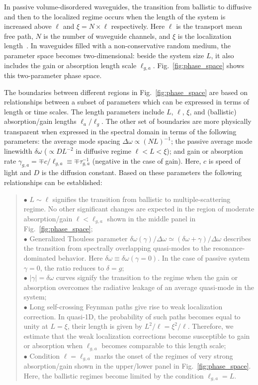 In passive volume-disordered waveguides, the transition from ballistic to diffusive and then to the localized regime occurs when the length of the system is increased above $\ell$ and $\xi=N\times\ell$ respectively. Here $\ell$ is the transport mean free path, $N$ is the number of waveguide channels, and $\xi$ is the localization length~\cite{1997_Beenakker}. In waveguides filled with a non-conservative random medium, the parameter space becomes two-dimensional: beside the system size $L$, it also includes the gain or absorption length scale $\ell_{g,a}$. Fig.~\ref{fig:phase_space} shows this two-parameter phase space.

The boundaries between different regions in Fig.~\ref{fig:phase_space} are based on relationships between a subset of parameters which can be expressed in terms of length or time scales. The length parameters include $L$, $\ell$, $\xi$, and (ballistic) absorption/gain lengths $\ell_a/\ell_g$. The other set of boundaries are more physically transparent when expressed in the spectral domain in terms of the following parameters: the average mode spacing $\Delta\omega\propto (NL)^{-1}$; the passive average mode linewidth $\delta\omega$ ($\propto DL^{-2}$ in diffusive regime $\ell<L<\xi$); and gain or absorption rate $\gamma_{g,a}=\mp c/\ell_{g,a}\equiv\mp\tau_{g,a}^{-1}$ (negative in the case of gain). Here, $c$ is speed of light and $D$ is the diffusion constant. Based on these parameters the following relationships can be established:
\begin{quote}
$\bullet$ $L\sim\ell$ signifies the transition from ballistic to multiple-scattering regime. No other significant changes are expected in the region of moderate absorption/gain $\ell<\ell_{g,a}$ shown in the middle panel in Fig.~\ref{fig:phase_space};\\
$\bullet$ Generalized Thouless parameter $\delta\omega(\gamma)/\Delta\omega\simeq(\delta\omega+\gamma)/\Delta\omega$ describes~\cite{2005_Yamilov_correlations} the transition from spectrally overlapping quasi-modes to the resonance-dominated behavior. Here $\delta\omega\equiv\delta\omega(\gamma=0)$. In the case of passive system $\gamma=0$, the ratio reduces to $\delta=g$;\\
$\bullet$ $|\gamma|=\delta\omega$ curves signify the transition to the regime when the gain or absorption overcomes the radiative leakage of an average quasi-mode in the system;\\
$\bullet$ Long self-crossing Feynman paths give rise to weak localization correction. In quasi-1D, the probability of such paths becomes equal to unity at $L=\xi$, their length is given by $L^2/\ell=\xi^2/\ell$. Therefore, we estimate that the weak localization corrections become susceptible to gain or absorption when $\ell_{g,a}$ becomes comparable to this length scale;\\
$\bullet$ Condition $\ell=\ell_{g,a}$ marks the onset of the regimes of very strong absorption/gain shown in the upper/lower panel in Fig.~\ref{fig:phase_space}. Here, the ballistic regimes become limited by the condition $\ell_{g,a}=L$.\\
\end{quote}
